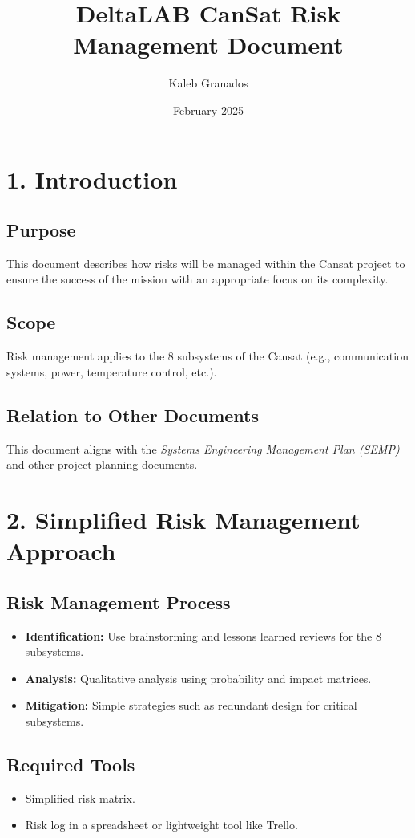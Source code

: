 \documentclass{article}
\title{DeltaLAB CanSat Risk Management Document}
\author{Kaleb Granados}
\date{February 2025}
\begin{document}
\maketitle
\newpage

\section*{1. Introduction}

\subsection*{Purpose}
This document describes how risks will be managed within the Cansat project to ensure the success of the mission with an appropriate focus on its complexity.

\subsection*{Scope}
Risk management applies to the 8 subsystems of the Cansat (e.g., communication systems, power, temperature control, etc.).

\subsection*{Relation to Other Documents}
This document aligns with the \textit{Systems Engineering Management Plan (SEMP)} and other project planning documents.

\section*{2. Simplified Risk Management Approach}

\subsection*{Risk Management Process}
\begin{itemize}
    \item \textbf{Identification:} Use brainstorming and lessons learned reviews for the 8 subsystems.
    \item \textbf{Analysis:} Qualitative analysis using probability and impact matrices.
    \item \textbf{Mitigation:} Simple strategies such as redundant design for critical subsystems.
\end{itemize}

\subsection*{Required Tools}
\begin{itemize}
    \item Simplified risk matrix.
    \item Risk log in a spreadsheet or lightweight tool like Trello.
\end{itemize}
\end{document}
